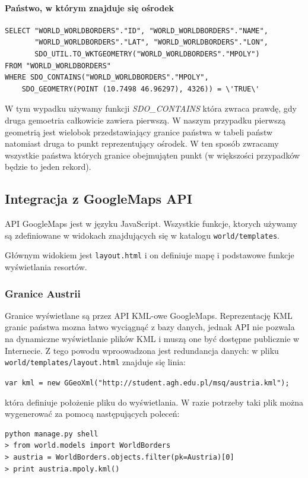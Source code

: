 \documentclass[12pt]{article}
\begin{document}
\paragraph{Państwo, w którym znajduje się ośrodek}
\begin{verbatim}
SELECT "WORLD_WORLDBORDERS"."ID", "WORLD_WORLDBORDERS"."NAME",
       "WORLD_WORLDBORDERS"."LAT", "WORLD_WORLDBORDERS"."LON",
       SDO_UTIL.TO_WKTGEOMETRY("WORLD_WORLDBORDERS"."MPOLY")
FROM "WORLD_WORLDBORDERS"
WHERE SDO_CONTAINS("WORLD_WORLDBORDERS"."MPOLY",
    SDO_GEOMETRY(POINT (10.7498 46.96297), 4326)) = \'TRUE\'
\end{verbatim}
W tym wypadku używamy funkcji \emph{SDO\_CONTAINS} która zwraca prawdę, gdy druga gemoetria całkowicie zawiera pierwszą.
W naszym przypadku pierwszą geometrią jest wielobok przedstawiający granice państwa w tabeli państw natomiast druga to
punkt reprezentujący ośrodek. W ten sposób zwracamy wszystkie państwa których granice obejmująten punkt (w większości
przypadków będzie to jeden rekord).

\subsection{Integracja z GoogleMaps API}
API GoogleMaps jest w języku JavaScript. Wszystkie funkcje, ktorych używamy są zdefiniowane w widokach znajdujących
się w katalogu \texttt{world/templates}.

Głównym widokiem jest \texttt{layout.html} i on definiuje mapę i podstawowe funkcje wyświetlania resortów.

\subsubsection{Granice Austrii}
Granice wyświetlane są przez API KML-owe GoogleMaps. Reprezentację KML granic państwa mozna łatwo wyciągnąć z bazy
danych, jednak API nie pozwala na dynamiczne wyświetlanie plików KML i muszą one być dostępne publicznie w Internecie.
Z tego powodu wproowadzona jest redundancja danych: w pliku \texttt{world/templates/layout.html} znajduje się linia:

\texttt{var kml = new GGeoXml("http://student.agh.edu.pl/msq/austria.kml");}

która definiuje położenie pliku do wyświetlania. W razie potrzeby taki plik można wygenerować za pomocą następujących
poleceń:

\begin{verbatim}
python manage.py shell
> from world.models import WorldBorders
> austria = WorldBorders.objects.filter(pk=Austria)[0]
> print austria.mpoly.kml()
\end{verbatim}
\end{document}
